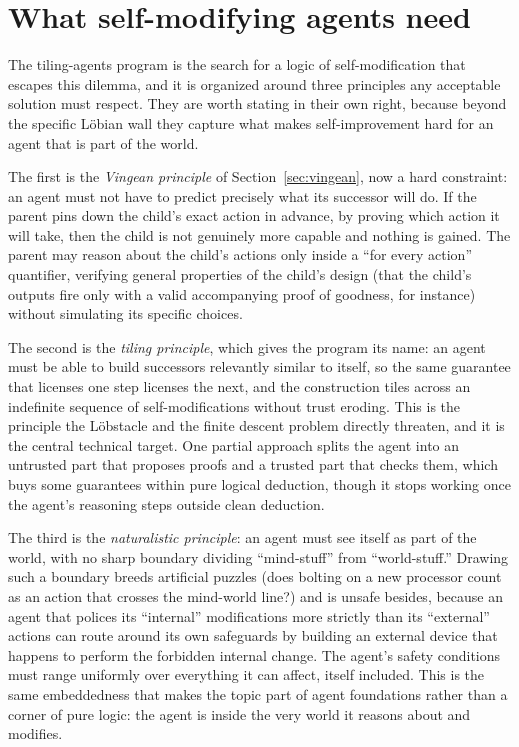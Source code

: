 \documentclass[10pt]{article}
\theoremstyle{definition}
\theoremstyle{remark}
\begin{document}
\section{What self-modifying agents need}
\label{sec:desiderata}

The tiling-agents program is the search for a logic of self-modification that escapes this dilemma, and it is organized around three principles any acceptable solution must respect. They are worth stating in their own right, because beyond the specific L\"obian wall they capture what makes self-improvement hard for an agent that is part of the world.

The first is the \emph{Vingean principle} of Section~\ref{sec:vingean}, now a hard constraint: an agent must not have to predict precisely what its successor will do. If the parent pins down the child's exact action in advance, by proving which action it will take, then the child is not genuinely more capable and nothing is gained. The parent may reason about the child's actions only inside a ``for every action'' quantifier, verifying general properties of the child's design (that the child's outputs fire only with a valid accompanying proof of goodness, for instance) without simulating its specific choices.

The second is the \emph{tiling principle}, which gives the program its name: an agent must be able to build successors relevantly similar to itself, so the same guarantee that licenses one step licenses the next, and the construction tiles across an indefinite sequence of self-modifications without trust eroding. This is the principle the L\"obstacle and the finite descent problem directly threaten, and it is the central technical target. One partial approach splits the agent into an untrusted part that proposes proofs and a trusted part that checks them, which buys some guarantees within pure logical deduction, though it stops working once the agent's reasoning steps outside clean deduction.

The third is the \emph{naturalistic principle}: an agent must see itself as part of the world, with no sharp boundary dividing ``mind-stuff'' from ``world-stuff.'' Drawing such a boundary breeds artificial puzzles (does bolting on a new processor count as an action that crosses the mind-world line?) and is unsafe besides, because an agent that polices its ``internal'' modifications more strictly than its ``external'' actions can route around its own safeguards by building an external device that happens to perform the forbidden internal change. The agent's safety conditions must range uniformly over everything it can affect, itself included. This is the same embeddedness that makes the topic part of agent foundations rather than a corner of pure logic: the agent is inside the very world it reasons about and modifies.
\end{document}
